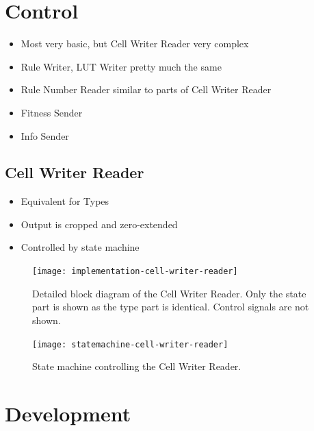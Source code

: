 

\section{Control}

\begin{itemize}
    \item Most very basic, but Cell Writer Reader very complex
    \item Rule Writer, LUT Writer pretty much the same
    \item Rule Number Reader similar to parts of Cell Writer Reader
    \item Fitness Sender
    \item Info Sender
\end{itemize}

\subsection{Cell Writer Reader}

\begin{itemize}
    \item Equivalent for Types
    \item Output is cropped and zero-extended
    \item Controlled by state machine
\end{itemize}

\begin{figure}[!ht]
    \centering
    \texttt{[image: implementation-cell-writer-reader]}
    \caption{
        Detailed block diagram of the Cell Writer Reader.
        Only the state part is shown as the type part is identical.
        Control signals are not shown.
    }
    \label{fig:implementation-cell-writer-reader}
\end{figure}

\begin{figure}[!ht]
    \centering
    \texttt{[image: statemachine-cell-writer-reader]}
    \caption{State machine controlling the Cell Writer Reader.}
    \label{fig:statemachine-cell-writer-reader}
\end{figure}

\section{Development}

